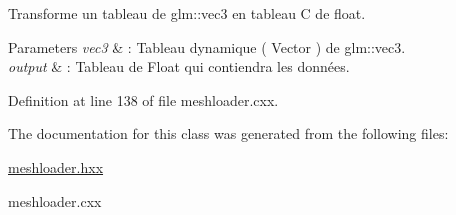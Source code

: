 Transforme un tableau de glm\-::vec3 en tableau C de float. 


\begin{DoxyParams}{Parameters}
{\em vec3} & \-: Tableau dynamique ( Vector ) de glm\-::vec3. \\
\hline
{\em output} & \-: Tableau de Float qui contiendra les données. \\
\hline
\end{DoxyParams}


Definition at line 138 of file meshloader.\-cxx.



The documentation for this class was generated from the following files\-:\begin{DoxyCompactItemize}
\item 
\hyperlink{meshloader_8hxx}{meshloader.\-hxx}\item 
meshloader.\-cxx\end{DoxyCompactItemize}
